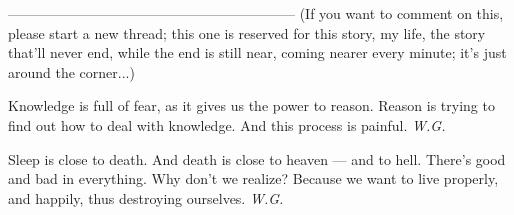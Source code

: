 --------------------------------------------------------------
(If you want to comment on this, please start a new thread; this one is reserved for this story, my life, the story that'll never end, while the end is still near, coming nearer every minute; it's just around the corner...)

Knowledge 
is full of fear, 
as it gives us the power 
to reason. 
Reason 
is trying to find out 
how to deal with knowledge. 
And this process 
is painful. 
\emph{W.G.}

Sleep 
is close to death. 
And death 
is close to heaven --- 
and to hell. 
There's good and bad 
in everything. 
Why don't we realize? 
Because we want to live 
properly, and happily, 
thus destroying ourselves. 
\emph{W.G.}

